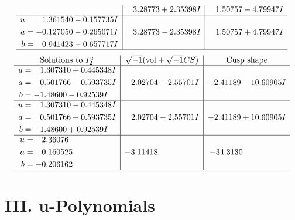 \documentclass[1p]{elsarticle_modified}
\theoremstyle{definition}
\newcommand{\I}{\sqrt{-1}}
\begin{document}
$$\begin{array}{c|c|c}
 & \phantom{-}3.28773 + 2.35398 I & \phantom{-}1.50757 - 4.79947 I \\ \hline\begin{aligned}
u &= \phantom{-}1.361540 - 0.157735 I \\
a &= -0.127050 - 0.265071 I \\
b &= \phantom{-}0.941423 - 0.657717 I\end{aligned}
 & \phantom{-}3.28773 - 2.35398 I & \phantom{-}1.50757 + 4.79947 I\\
 \hline 
 \end{array}$$\newpage$$\begin{array}{c|c|c}  
\text{Solutions to }I^u_{2}& \I (\text{vol} + \sqrt{-1}CS) & \text{Cusp shape}\\
 \hline 
\begin{aligned}
u &= \phantom{-}1.307310 + 0.445348 I \\
a &= \phantom{-}0.501766 - 0.593735 I \\
b &= -1.48600 - 0.92539 I\end{aligned}
 & \phantom{-}2.02704 + 2.55701 I & -2.41189 - 10.60905 I \\ \hline\begin{aligned}
u &= \phantom{-}1.307310 - 0.445348 I \\
a &= \phantom{-}0.501766 + 0.593735 I \\
b &= -1.48600 + 0.92539 I\end{aligned}
 & \phantom{-}2.02704 - 2.55701 I & -2.41189 + 10.60905 I \\ \hline\begin{aligned}
u &= -2.36076\phantom{ +0.000000I} \\
a &= \phantom{-}0.160525\phantom{ +0.000000I} \\
b &= -0.206162\phantom{ +0.000000I}\end{aligned}
 & -3.11418\phantom{ +0.000000I} & -34.3130\phantom{ +0.000000I}\\
 \hline 
 \end{array}$$\newpage
\newpage\renewcommand{\arraystretch}{1}
\centering \section*{ III. u-Polynomials}
\end{document}
